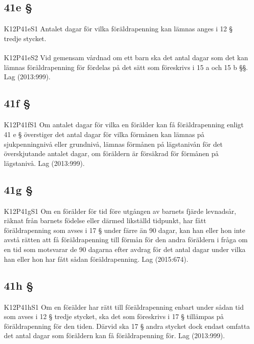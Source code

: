 \documentclass[a4paper,notitlepage,openany,10pt]{book}
\begin{document}
\subsection*{41e §}
\paragraph*{}
{\tiny K12P41eS1}
Antalet dagar för vilka föräldrapenning kan lämnas anges i 12 § tredje stycket.
\paragraph*{}
{\tiny K12P41eS2}
Vid gemensam vårdnad om ett barn ska det antal dagar som det kan lämnas föräldrapenning för fördelas på det sätt som föreskrivs i 15 a och 15 b §§.
Lag (2013:999).
\subsection*{41f §}
\paragraph*{}
{\tiny K12P41fS1}
Om antalet dagar för vilka en förälder kan få föräldrapenning enligt 41 e § överstiger det antal dagar för vilka förmånen kan lämnas på sjukpenningnivå eller grundnivå, lämnas förmånen på lägstanivån för det överskjutande antalet dagar, om föräldern är försäkrad för förmånen på lägstanivå.
Lag (2013:999).
\subsection*{41g §}
\paragraph*{}
{\tiny K12P41gS1}
Om en förälder för tid före utgången av barnets fjärde levnadsår, räknat från barnets födelse eller därmed likställd tidpunkt, har fått föräldrapenning som avses i 17 § under färre än 90 dagar, kan han eller hon inte avstå rätten att få föräldrapenning till förmån för den andra föräldern i fråga om en tid som motsvarar de 90 dagarna efter avdrag för det antal dagar under vilka han eller hon har fått sådan föräldrapenning.
Lag (2015:674).
\subsection*{41h §}
\paragraph*{}
{\tiny K12P41hS1}
Om en förälder har rätt till föräldrapenning enbart under sådan tid som avses i 12 § tredje stycket, ska det som föreskrivs i 17 § tillämpas på föräldrapenning för den tiden.
Därvid ska 17 § andra stycket dock endast omfatta det antal dagar som föräldern kan få föräldrapenning för.
Lag (2013:999).
\end{document}
